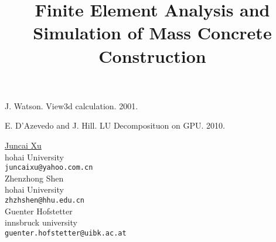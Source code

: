 \documentclass[article,A4,11pt]{llncs}%
\begin{document}

\begin{thebibliography}{10}
{\sc J. Watson}. {View3d calculation}. 2001.

{\sc E. D'Azevedo and J. Hill}. {LU Decomposituon on GPU}. 2010.
\end{thebibliography}

\title{Finite Element Analysis and Simulation of Mass Concrete Construction}
 \author{} \institute{}
\maketitle
\begin{center}
{\large \underline{Juncai Xu}}\\
hohai University\\
{\tt juncaixu@yahoo.com.cn}
\\ \vspace{4mm}
{\large Zhenzhong Shen}\\
hohai University\\
{\tt zhzhshen@hhu.edu.cn}
\\ \vspace{4mm}
{\large Guenter Hofstetter}\\
innsbruck university\\
{\tt guenter.hofstetter@uibk.ac.at}
\end{center}
\end{document}
